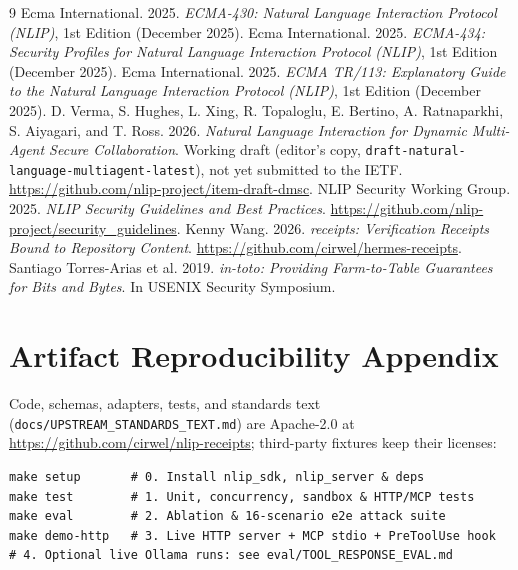 \documentclass[sigconf,nonacm]{acmart}
\begin{document}
\begin{thebibliography}{9}
Ecma International. 2025. \emph{ECMA-430: Natural Language Interaction Protocol (NLIP)}, 1st Edition (December 2025).
Ecma International. 2025. \emph{ECMA-434: Security Profiles for Natural Language Interaction Protocol (NLIP)}, 1st Edition (December 2025).
Ecma International. 2025. \emph{ECMA TR/113: Explanatory Guide to the Natural Language Interaction Protocol (NLIP)}, 1st Edition (December 2025).
D. Verma, S. Hughes, L. Xing, R. Topaloglu, E. Bertino, A. Ratnaparkhi, S. Aiyagari, and T. Ross. 2026. \emph{Natural Language Interaction for Dynamic Multi-Agent Secure Collaboration}. Working draft (editor's copy, \texttt{draft-natural-language-multiagent-latest}), not yet submitted to the IETF. \url{https://github.com/nlip-project/item-draft-dmsc}.
NLIP Security Working Group. 2025. \emph{NLIP Security Guidelines and Best Practices}. \url{https://github.com/nlip-project/security_guidelines}.
Kenny Wang. 2026. \emph{receipts: Verification Receipts Bound to Repository Content}. \url{https://github.com/cirwel/hermes-receipts}.
Santiago Torres-Arias et al. 2019. \emph{in-toto: Providing Farm-to-Table Guarantees for Bits and Bytes}. In USENIX Security Symposium.
\end{thebibliography}

\appendix
\section{Artifact Reproducibility Appendix}
Code, schemas, adapters, tests, and standards text (\texttt{docs/UPSTREAM\_STANDARDS\_TEXT.md}) are Apache-2.0 at \url{https://github.com/cirwel/nlip-receipts}; third-party fixtures keep their licenses:
\begin{lstlisting}
make setup       # 0. Install nlip_sdk, nlip_server & deps
make test        # 1. Unit, concurrency, sandbox & HTTP/MCP tests
make eval        # 2. Ablation & 16-scenario e2e attack suite
make demo-http   # 3. Live HTTP server + MCP stdio + PreToolUse hook
# 4. Optional live Ollama runs: see eval/TOOL_RESPONSE_EVAL.md
\end{lstlisting}
\end{document}
